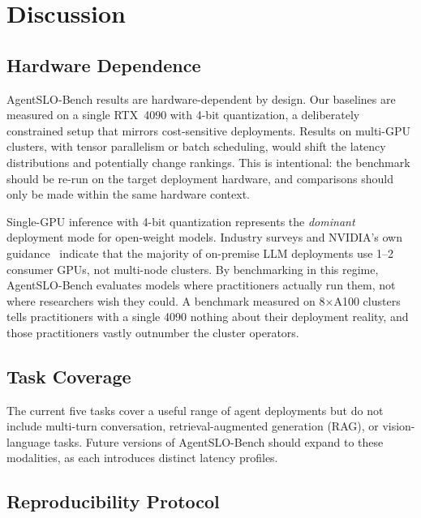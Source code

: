 \documentclass[11pt]{article}
\begin{document}
\section{Discussion}

\subsection{Hardware Dependence}

AgentSLO-Bench results are hardware-dependent by design.  Our baselines are measured on a single RTX~4090 with 4-bit quantization, a deliberately constrained setup that mirrors cost-sensitive deployments.  Results on multi-GPU clusters, with tensor parallelism or batch scheduling, would shift the latency distributions and potentially change rankings.  This is intentional: the benchmark should be re-run on the target deployment hardware, and comparisons should only be made within the same hardware context.

Single-GPU inference with 4-bit quantization represents the \emph{dominant} deployment mode for open-weight models.  Industry surveys and NVIDIA's own guidance~\cite{nvidia2025slm} indicate that the majority of on-premise LLM deployments use 1--2 consumer GPUs, not multi-node clusters.  By benchmarking in this regime, AgentSLO-Bench evaluates models where practitioners actually run them, not where researchers wish they could.  A benchmark measured on 8$\times$A100 clusters tells practitioners with a single 4090 nothing about their deployment reality, and those practitioners vastly outnumber the cluster operators.

\subsection{Task Coverage}

The current five tasks cover a useful range of agent deployments but do not include multi-turn conversation, retrieval-augmented generation (RAG), or vision-language tasks.  Future versions of AgentSLO-Bench should expand to these modalities, as each introduces distinct latency profiles.

\subsection{Reproducibility Protocol}
\end{document}
